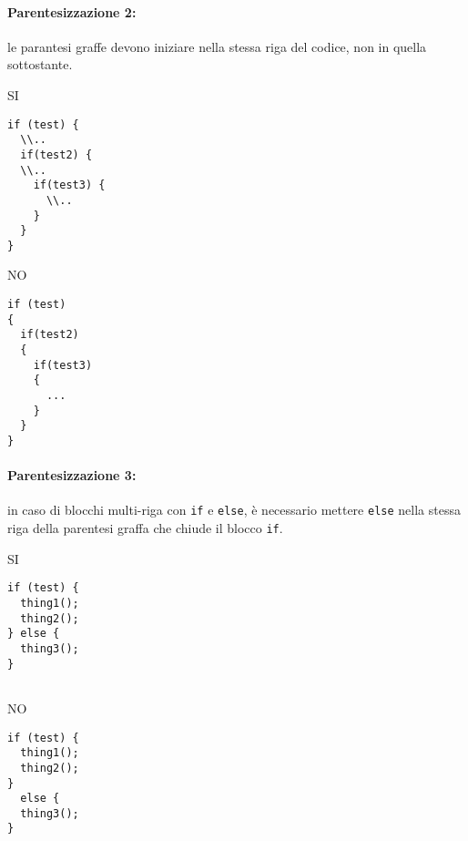 \documentclass[../ProcessiPrimari.tex]{subfiles}
\begin{document}
\paragraph{Parentesizzazione 2:} le parantesi graffe devono iniziare nella stessa riga del codice, non in quella sottostante.

\begin{center}{
\begin{minipage}{6cm}
	{\begin{center}SI\end{center}}
	\begin{Verbatim}[frame=single]
if (test) {
  \\..
  if(test2) {
  \\..
    if(test3) {
	  \\..
    }
  }
}

	\end{Verbatim}
\end{minipage}
\hfil
\begin{minipage}{6cm}
	{\begin{center}NO\end{center}}
	\begin{Verbatim}[frame=single]
if (test) 
{
  if(test2)
  {
    if(test3)
    {
      ...
    }
  }
}
	\end{Verbatim}
\end{minipage}
}
\end{center}	
\paragraph{Parentesizzazione 3:} in caso di blocchi multi-riga con \texttt{if} e \texttt{else}, è necessario mettere \texttt{else} nella stessa riga della parentesi graffa che chiude il blocco \texttt{if}.

\begin{center}{
\begin{minipage}{6cm}
	{\begin{center}SI\end{center}}
	\begin{Verbatim}[frame=single]
if (test) {
  thing1();
  thing2();
} else {
  thing3();
}
	
	\end{Verbatim}
\end{minipage}
\hfil
\begin{minipage}{6cm}
	{\begin{center}NO\end{center}}
	\begin{Verbatim}[frame=single]
if (test) {
  thing1();
  thing2();
}
  else {
  thing3();
}
	\end{Verbatim}
\end{minipage}
}
\end{center}
\end{document}
